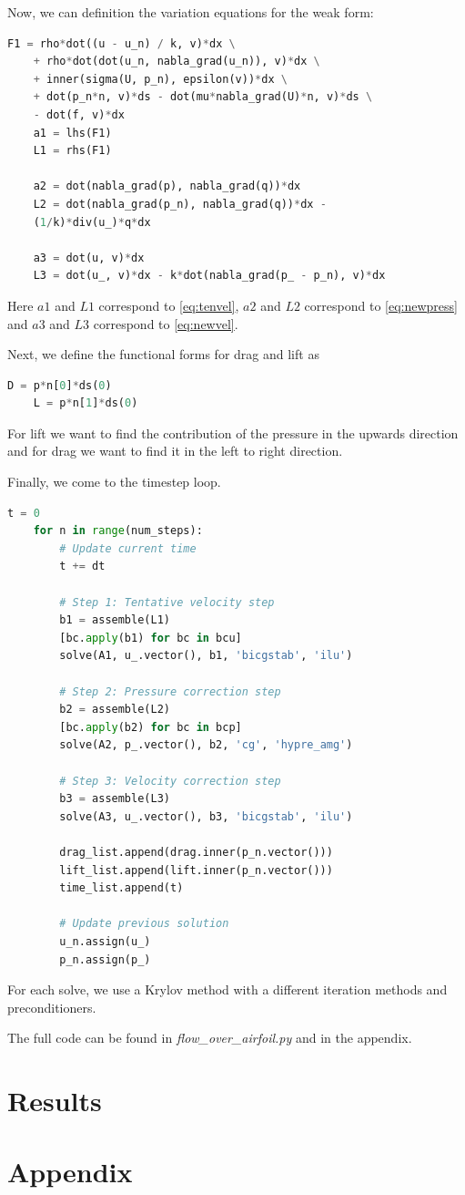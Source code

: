 \documentclass[12pt]{article}
\theoremstyle{definition}
\numberwithin{equation}{section}
\begin{document}
	Now, we can definition the variation equations for the weak form:
	\begin{lstlisting}[language=Python]
	F1 = rho*dot((u - u_n) / k, v)*dx \
	+ rho*dot(dot(u_n, nabla_grad(u_n)), v)*dx \
	+ inner(sigma(U, p_n), epsilon(v))*dx \
	+ dot(p_n*n, v)*ds - dot(mu*nabla_grad(U)*n, v)*ds \
	- dot(f, v)*dx
	a1 = lhs(F1)
	L1 = rhs(F1)
	
	a2 = dot(nabla_grad(p), nabla_grad(q))*dx
	L2 = dot(nabla_grad(p_n), nabla_grad(q))*dx -
	(1/k)*div(u_)*q*dx
	
	a3 = dot(u, v)*dx
	L3 = dot(u_, v)*dx - k*dot(nabla_grad(p_ - p_n), v)*dx
	\end{lstlisting}
	
	Here $a1$ and $L1$ correspond to \cref{eq:tenvel}, $a2$ and $L2$ correspond to \cref{eq:newpress} and $a3$ and $L3$ correspond to \cref{eq:newvel}.
	
	Next, we define the functional forms for drag and lift as
	\begin{lstlisting}[language=Python]
	D = p*n[0]*ds(0)
	L = p*n[1]*ds(0)
	\end{lstlisting}
	
	For lift we want to find the contribution of the pressure in the upwards direction and for drag we want to find it in the left to right direction. 
	
	Finally, we come to the timestep loop.
	\begin{lstlisting}[language=Python]
	t = 0
	for n in range(num_steps):
		# Update current time
		t += dt
		
		# Step 1: Tentative velocity step
		b1 = assemble(L1)
		[bc.apply(b1) for bc in bcu]
		solve(A1, u_.vector(), b1, 'bicgstab', 'ilu')
		
		# Step 2: Pressure correction step
		b2 = assemble(L2)
		[bc.apply(b2) for bc in bcp]
		solve(A2, p_.vector(), b2, 'cg', 'hypre_amg')
		
		# Step 3: Velocity correction step
		b3 = assemble(L3)
		solve(A3, u_.vector(), b3, 'bicgstab', 'ilu')
		
		drag_list.append(drag.inner(p_n.vector()))
		lift_list.append(lift.inner(p_n.vector()))
		time_list.append(t)
		
		# Update previous solution
		u_n.assign(u_)
		p_n.assign(p_)
	\end{lstlisting}
	
	For each solve, we use a Krylov method with a different iteration methods and preconditioners. 

	The full code can be found in \textit{flow\_over\_airfoil.py} and in the appendix.
	\section*{Results}
	
	
	
	\section*{Appendix}
	
	
	
	
\end{document}
